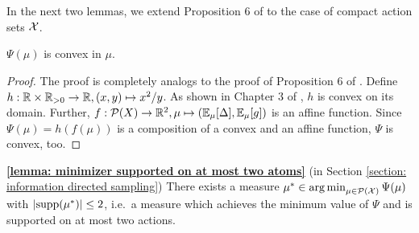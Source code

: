In the next two lemmas, we extend Proposition 6 of \cite{RussoLearningOptimizeInformationDirected2014} to the case of compact action sets $\mathcal{X}$.
\begin{lemma}\label{lemma: psi is convex}
	$\Psi(\mu)$ is convex in $\mu$.
\end{lemma}
\begin{proof}
	The proof is completely analogs to the proof of Proposition 6 of \cite{RussoLearningOptimizeInformationDirected2014}. Define $h : \mathbb{R}\times \mathbb{R}_{> 0} \rightarrow \mathbb{R}, (x,y) \mapsto x^2/y$. As shown in Chapter 3 of \cite{BoydConvexoptimization2004},  $h$ is convex on its domain. Further, $f:\mathcal{P}(X) \rightarrow \mathbb{R}^2, \mu \mapsto (\mathbb{E}_{\mu}[\Delta], \mathbb{E}_{\mu}[g])$ is an affine function. Since $\Psi(\mu) = h(f(\mu))$ is a composition of a convex and an affine function, $\Psi$ is convex, too.
\end{proof}
\begin{lemma*}\textnormal{\textbf{\ref{lemma: minimizer supported on at most two atoms}} \textnormal{(in Section \ref{section: information directed sampling}})} 
	There exists a measure $\mu^* \in \operatorname*{arg\,min}_{\mu \in \mathcal{P}(\mathcal{X})} \Psi(\mu)$ with $|\text{supp}(\mu^*)| \leq 2$, i.e.\ a measure which achieves the minimum value of $\Psi$ and is supported on at most two actions.
\end{lemma*} 
